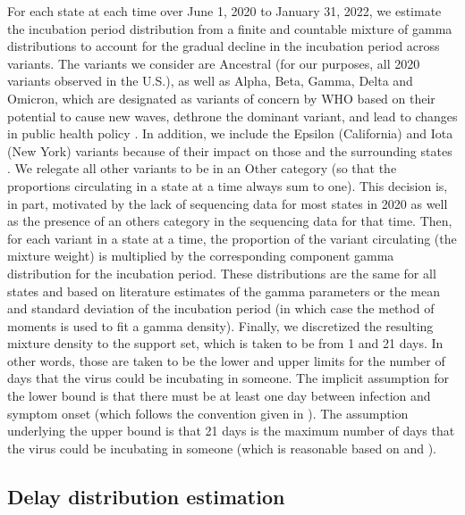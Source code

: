 \documentclass{article}
\begin{document}
For each state at each time over June 1, 2020 to January 31, 2022, we estimate
the incubation period distribution from a finite and countable mixture of gamma
distributions to account for the gradual decline in the incubation period across
variants. The variants we consider are Ancestral (for our purposes, 
all 2020 variants observed in the U.S.), as well as Alpha, Beta, Gamma, Delta and Omicron,
which are designated as variants of concern by WHO based on their potential to
cause new waves, dethrone the dominant variant, and lead to changes in public
health policy \citep{who2021tracking}. In addition, we include the Epsilon
(California) and Iota (New York) variants because of their impact on those and
the surrounding states \citep{yang2022investigation, duerr2021dominance}. We
relegate all other variants to be in an Other category (so that the proportions
circulating in a state at a time always sum to one). This decision is, in part,
motivated by the lack of sequencing data for most states in 2020 as well as the
presence of an others category in the sequencing data for that time. 
Then, for each variant in a state at a time, the proportion of the variant
circulating (the mixture weight) is multiplied by the corresponding component
gamma distribution for the incubation period. These distributions are the same
for all states and based on literature estimates of the gamma parameters or the
mean and standard deviation of the incubation period (in which case the method
of moments is used to fit a gamma density). Finally, we discretized the
resulting mixture density to the support set, which is taken to be from 1 and
21 days. In other words, those are taken to be the lower and upper limits for
the number of days that the virus could be incubating in someone. The implicit
assumption for the lower bound is that there must be at least one day between
infection and symptom onset (which follows the convention given in
\citealp{phcan2021covid}). The assumption underlying the upper bound is that 21
days is the maximum number of days that the virus could be incubating in someone
(which is reasonable based on \citealp{zaki2021estimations} and
\citealp{cortes2022sars}).

\subsection{Delay distribution estimation} 
\end{document}

